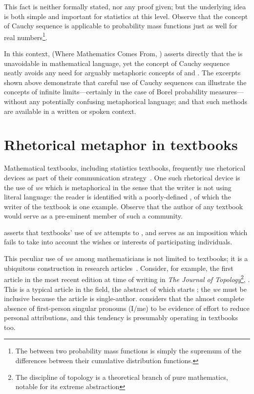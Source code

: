   \noindent
This fact is neither formally stated, nor any proof given; but the
underlying idea is both simple and important for statistics at this
level.  Observe that the concept of Cauchy sequence is applicable to
probability mass functions just as well for real numbers\footnote{The
   between two probability mass functions is simply
  the supremum of the differences between their cumulative
  distribution functions.}.

In this context, \wmcf (Where Mathematics Comes From,
\cite{lakoff2000}) asserts directly that the \bmi is unavoidable in
mathematical language, yet the concept of Cauchy sequence neatly
avoids any need for arguably metaphoric concepts of  and
.  The excerpts shown above demonstrate that
careful use of Cauchy sequences can illustrate the concepts of
infinite limits---certainly in the case of Borel probability
measures---without any potentially confusing metaphorical language;
and that such methods are available in a written or spoken context.

\section{Rhetorical \label{we_start} metaphor in textbooks}

Mathematical textbooks, including statistics textbooks, frequently use
rhetorical devices as part of their communication
strategy~\citep{kane1970}.  One such rhetorical device is the use of
\emph{we} which is metaphorical in the sense that the writer is not
using literal language: the reader is identified with a poorly-defined
, of which the writer of the textbook is
one example.  Observe that the author of any textbook would serve as a
pre-eminent member of such a community.

\cite{pimm1984} asserts that textbooks' use of \emph{we}
attempts to , and
serves as an imposition which fails to take into account the wishes or
interests of participating individuals.

This peculiar use of \emph{we} among mathematicians is not limited to
textbooks; it is a ubiquitous construction in research
articles~\parencite{kuo1999}.  Consider, for example, the first
article in the most recent edition at time of writing in \emph{The
  Journal of Topology}\footnote{The discipline of topology is a
  theoretical branch of pure mathematics, notable for its extreme
  abstraction}, \parencite{lange2016}. This is a typical article in
the field, the abstract of which starts ; the \emph{we} must be
inclusive because the article is single-author.  
considers that the almost complete absence of first-person singular
pronouns (I/me) to be evidence of effort to reduce personal
attributions, and this tendency is presumably operating in textbooks
too.

